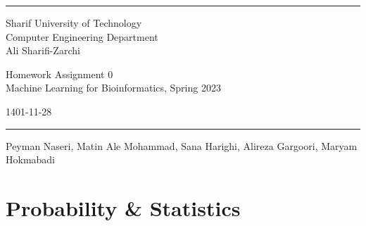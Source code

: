 \documentclass[a4paper]{article}
\begin{document}
	
	
	\fancyhead[C]{}
	\hrule \medskip %
	\begin{minipage}{0.295\textwidth} 
		\raggedright
		\footnotesize
		  Sharif University of Technology \hfill\\   
		Computer Engineering Department\hfill\\
		Ali Sharifi-Zarchi
	\end{minipage}
	\begin{minipage}{0.4\textwidth} 
		\centering 
		\large 
		Homework Assignment 0\\ 
		\normalsize 
		Machine Learning for Bioinformatics, Spring 2023\\ 
	\end{minipage}
	\begin{minipage}{0.295\textwidth} 
		\raggedleft
		\small
            1401-11-28
            \hfill\\
	\end{minipage}
	\medskip\hrule 
	\bigskip
	

        \begin{center}
            Peyman Naseri, Matin Ale Mohammad, Sana Harighi, Alireza Gargoori, Maryam Hokmabadi
        \end{center}
        
        \section{Probability \& Statistics}
\end{document}
